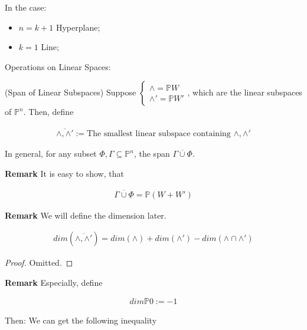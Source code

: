 \documentclass[Total.tex]{subfiles}
\begin{document}
			In the case:
			
			\begin{itemize}
				\item $n=k+1$ Hyperplane;
				\item $k=1$ Line;
			\end{itemize}
			
			Operations on Linear Spaces:
			
			\begin{Def}
				(Span of Linear Subspaces) Suppose $\begin{cases}
					\wedge=\mathbb{P}W\\
					\wedge'=\mathbb{P}W'
				\end{cases}$, which are the linear subspaces of $\mathbb{P}^n$. Then, define
				
				\begin{gather*}
					\overline{\wedge,\wedge'}:=\mbox{The smallest linear subspace containing }\wedge,\wedge'
				\end{gather*}
				
				In general, for any subset $\Phi,\Gamma\subseteq \mathbb{P}^n$, the span $\overline{\Gamma\cup \Phi}$.
			\end{Def}
			
			\textbf{Remark} It is easy to show, that
			
			\begin{gather*}
				\overline{\Gamma\cup \Phi}=\mathbb{P}(W+W')
			\end{gather*}
			
			\textbf{Remark} We will define the dimension later. 
			
			\begin{proposition}
				
				
				\begin{gather*}
					dim(\overline{\wedge,\wedge'})=dim(\wedge)+dim(\wedge')-dim(\wedge\cap \wedge')
				\end{gather*}
			\end{proposition}
			
			\begin{proof}
				Omitted.
			\end{proof}
			
			\textbf{Remark} Especially, define
			
			\begin{gather*}
				dim\mathbb{P}0:=-1
			\end{gather*}
			
			Then: We can get the following inequality
			
\end{document}
